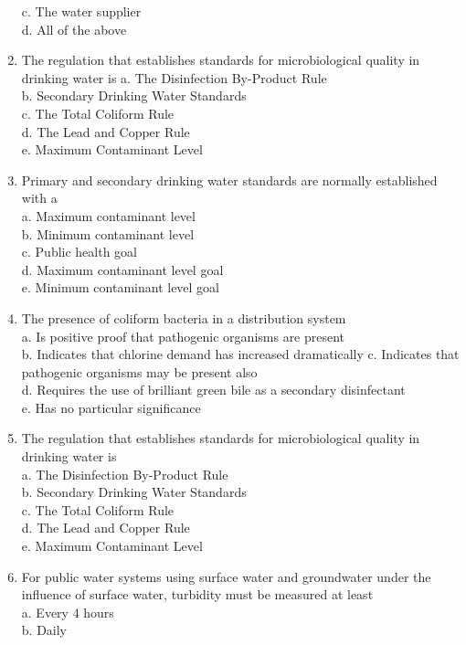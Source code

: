 \begin{enumerate}
c. The water supplier\\
d. All of the above\\
\item The regulation that establishes standards for microbiological quality in drinking water is a. The Disinfection By-Product Rule\\
b. Secondary Drinking Water Standards\\
c. The Total Coliform Rule\\
d. The Lead and Copper Rule\\
e. Maximum Contaminant Level\\
\item Primary and secondary drinking water standards are normally established with a\\
a. Maximum contaminant level\\
b. Minimum contaminant level\\
c. Public health goal\\
d. Maximum contaminant level goal\\
e. Minimum contaminant level goal\\
\item The presence of coliform bacteria in a distribution system\\
a. Is positive proof that pathogenic organisms are present\\
b. Indicates that chlorine demand has increased dramatically c. Indicates that pathogenic organisms may be present also\\
d. Requires the use of brilliant green bile as a secondary disinfectant\\
e. Has no particular significance\\
\item The regulation that establishes standards for microbiological quality in drinking water is\\
a. The Disinfection By-Product Rule\\
b. Secondary Drinking Water Standards\\
c. The Total Coliform Rule\\
d. The Lead and Copper Rule\\
e. Maximum Contaminant Level\\
\item For public water systems using surface water and groundwater under the influence of surface water, turbidity must be measured at least\\
a. Every 4 hours\\
b. Daily\\

\end{enumerate}
